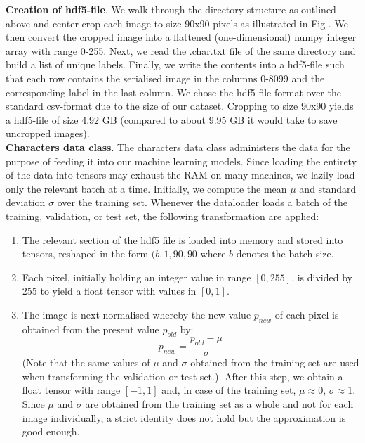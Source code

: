 \documentclass[british,12p]{article}
\begin{document}
    	
    	\textbf{Creation of hdf5-file}. We walk through the directory structure as outlined above and center-crop each image to size 90x90 pixels as illustrated in Fig . We then convert the cropped image into a flattened (one-dimensional) numpy integer array with range 0-255. Next, we read the .char.txt file of the same directory and build a list of unique labels. Finally, we write the contents into a hdf5-file such that each row contains the serialised image in the columns 0-8099 and the corresponding label in the last column. We chose the hdf5-file format over the standard csv-format due to the size of our dataset. Cropping to size 90x90 yields a hdf5-file of size 4.92 GB (compared to about 9.95 GB it would take to save uncropped images).\\
    	
    	
    	\textbf{Characters data class}. The characters data class administers the data for the purpose of feeding it into our machine learning models. Since loading the entirety of the data into tensors may exhaust the RAM on many machines, we lazily load only the relevant batch at a time. Initially, we compute the mean $\mu$ and standard deviation $\sigma$ over the training set. Whenever the dataloader loads a batch of the training, validation, or test set, the following transformation are applied:
    	\begin{enumerate}
    		\item The relevant section of the hdf5 file is loaded into memory and stored into tensors, reshaped in the form $(b, 1, 90, 90$ where $b$ denotes the batch size.
    		\item Each pixel, initially holding an integer value in range $[0, 255]$, is divided by $255$ to yield a float tensor with values in $[0, 1]$.
    		\item The image is next normalised whereby the new value $p_{new}$ of each pixel is obtained from the present value $p_{old}$ by: $$ p_{new} = \frac{p_{old} - \mu}{\sigma}$$ (Note that the same values of $\mu$ and $\sigma$  obtained from the training set are used when transforming the validation or test set.). After this step, we obtain a float tensor with range $[-1, 1]$ and, in case of the training set, $\mu \approx 0$, $\sigma \approx 1$. Since $\mu$ and $\sigma$ are obtained from the training set as a whole and not for each image individually, a strict identity does not hold but the approximation is good enough.
    	\end{enumerate}
    	
\end{document}

